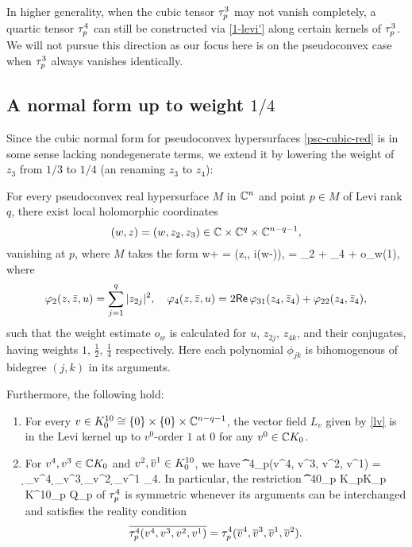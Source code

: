 \documentclass[12pt]{amsart}
\begin{document}
\br
In higher generality, when the cubic tensor $\tau^3_p$ may not vanish completely,
a quartic tensor $\tau^4_p$ can still be constructed via \eqref{1-levi'} 
along certain kernels of $\tau^3_p$.
We will not pursue this direction as our focus here is on 
the pseudoconvex case when $\tau^3_p$ always vanishes identically.
\er







\subsection{A normal form up to weight $1/4$}
Since the cubic normal form for pseudoconvex hypersurfaces \eqref{psc-cubic-red}
is in some sense lacking nondegenerate terms, 
we extend it by lowering the weight of $z_3$ from $1/3$ to $1/4$
(an renaming $z_3$ to $z_4$):

\bp{}
For every pseudoconvex real hypersurface $M$ in ${\mathbb{C}}^{n}$ 
and point $p\in M$ of Levi rank $q$, 
there exist local holomorphic coordinates 
$$
	(w,z)=(w,z_2, z_3)\in {\mathbb{C}}\times {\mathbb{C}}^q\times {\mathbb{C}}^{n-q-1},
$$ 
vanishing at $p$,
where $M$ takes the form
\beq{}
	w+ \w = \phi(z,\z , i(w-\w)), 
	\quad
	\phi = \phi_2 + \phi_4 + o_w(1), 
\eeq
where
$$
	\varphi_2(z,{\bar z},u) = \sum_{j=1}^q |z_{2j}|^2,
	\quad
	\varphi_4(z,{\bar z},u) = 2{\sf Re}\, \varphi_{31}(z_4,{\bar z}_4) + \varphi_{22}(z_4,{\bar z}_4),
$$
such that the weight estimate $o_w$ is calculated for $u$, $z_{2j}$, $z_{4k}$, and their conjugates, 
having weights 
$1$, $\frac12$, $\frac14$ respectively.
Here each polynomial $\phi_{jk}$ is bihomogenous of bidegree $(j,k)$ in its arguments.

Furthermore, the following hold:
\begin{enumerate}
\item
For every 
$v\in K^{10}_0\cong \{0\} \times \{0\} \times {\mathbb{C}}^{n-q-1}$, 
the vector field $L_v$ given by \eqref{lv} is 
in the Levi kernel up to $v^0$-order $1$ at $0$
for any $v^0\in {\mathbb{C}} K_0$.
\item
For $v^4, v^3\in {\mathbb{C}} K_0$
and
$v^2, \overline{v}^1\in K^{10}_0$,
we have
\beq{}
	\t^4_p(v^4, v^3, v^2, v^1) 
	= \d_{v^4} \d_{v^3} \d_{v^2} \d_{v^1} \phi_4.
\eeq
%
In particular, the restriction
\beq{}
	\t^{40}_p \colon \C K_p\times  \C K_p \times K^{10}_p\times {} \to \C Q_p
\eeq 
of $\tau^4_p$ is symmetric whenever its arguments can be interchanged
and satisfies the reality condition
$$
	\overline{\tau^4_p(v^4, v^3, v^2, v^1)}
	=
	\tau^4_p(\overline{v}^4, \overline{v}^3, \overline{v}^1, \overline{v}^2).
$$
\end{enumerate}
\ep
\end{document}

